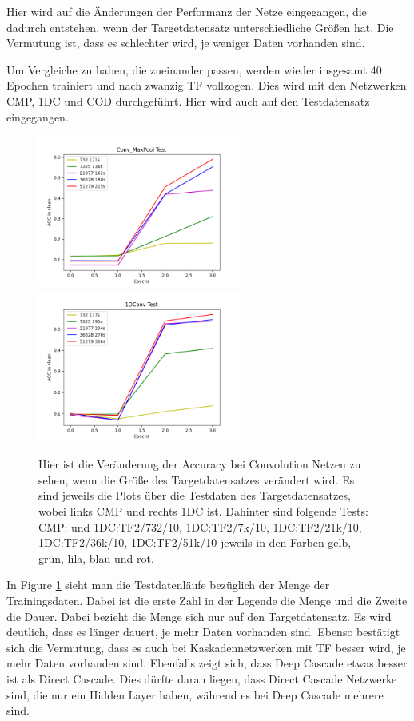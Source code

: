 Hier wird auf die Änderungen der Performanz der Netze eingegangen, die dadurch entstehen, wenn der Targetdatensatz unterschiedliche Größen hat. 
Die Vermutung ist, dass es schlechter wird, je weniger Daten vorhanden sind. 

Um Vergleiche zu haben, die zueinander passen, werden wieder insgesamt 40 Epochen trainiert und nach zwanzig TF vollzogen. Dies wird mit den 
Netzwerken 
CMP, 1DC und COD durchgeführt. Hier wird auch auf den Testdatensatz eingegangen. 

\begin{figure}[htpb]
    \includegraphics[height=5cm]{../../Plots/ba_plots/targetgroesse/cmp_ts.png}
    \includegraphics[height=5cm]{../../Plots/ba_plots/targetgroesse/1dc_ts.png}
    \caption{\label{fig:targetgroessedeepdir} 
    \small{Hier ist die Veränderung der Accuracy bei Convolution Netzen zu sehen, wenn die Größe des Targetdatensatzes verändert wird. 
    Es sind jeweils die Plots über die Testdaten des Targetdatensatzes, wobei links CMP und rechts 1DC ist. 
    Dahinter sind folgende Tests: CMP: und 
    1DC:TF2/732/10, 1DC:TF2/7k/10, 1DC:TF2/21k/10, 1DC:TF2/36k/10, 1DC:TF2/51k/10 jeweils in den Farben gelb, grün, lila, blau und rot. 
    }}
\end{figure}

In Figure \ref{fig:targetgroessedeepdir} sieht man die Testdatenläufe bezüglich der Menge der Trainingsdaten. Dabei ist die erste Zahl in der Legende die Menge und die 
Zweite die Dauer. Dabei bezieht die Menge sich nur auf den Targetdatensatz. Es wird deutlich, dass es länger dauert, je mehr Daten vorhanden sind. 
Ebenso bestätigt sich die Vermutung, dass es auch bei Kaskadennetzwerken mit TF besser wird, je mehr Daten vorhanden sind. 
Ebenfalls zeigt sich, dass Deep Cascade etwas besser ist als Direct Cascade. Dies dürfte daran liegen, dass Direct Cascade Netzwerke sind, 
die nur ein Hidden Layer haben, während es bei Deep Cascade mehrere sind. 

